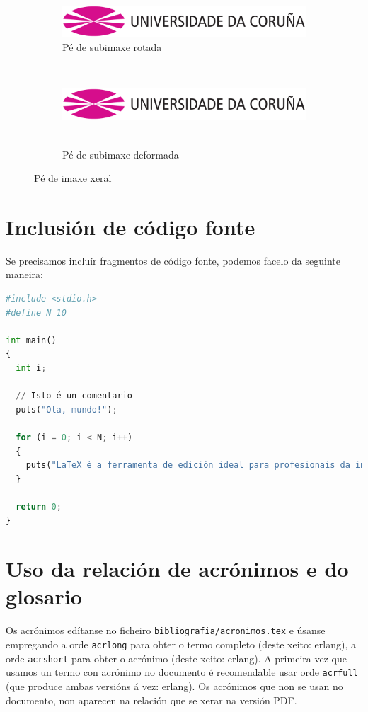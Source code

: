 \begin{figure}[hp!]
  \centering
  \begin{subfigure}[c]{0.3\textwidth}
    \includegraphics[angle=45,width=\textwidth]{imaxes/udc.png}
    \caption{Pé de subimaxe rotada}
    \label{fig:subfigura-rotada}
  \end{subfigure}
  \hspace{0.1\textwidth}
  \begin{subfigure}[c]{0.3\textwidth}
    \includegraphics[width=\textwidth,height=3cm]{imaxes/udc.png}
    \caption{Pé de subimaxe deformada}
    \label{fig:subfigura-deformada}
  \end{subfigure}
  \caption{Pé de imaxe xeral}
  \label{fig:exemplo-subfiguras}
\end{figure}

\section{Inclusión de código fonte}

Se precisamos incluír fragmentos de código fonte, podemos facelo da
seguinte maneira:

\begin{lstlisting}[language=PYTHON]
#include <stdio.h>
#define N 10

int main()
{
  int i;

  // Isto é un comentario
  puts("Ola, mundo!");

  for (i = 0; i < N; i++)
  {
    puts("LaTeX é a ferramenta de edición ideal para profesionais da informática!");
  }

  return 0;
}
\end{lstlisting}

\section{Uso da relación de acrónimos e do glosario}

Os acrónimos edítanse no ficheiro \texttt{bibliografia/acronimos.tex}
e úsanse empregando a orde \texttt{acrlong} para obter o termo
completo (deste xeito: \acrlong{erlang}), a orde \texttt{acrshort}
para obter o acrónimo (deste xeito: \acrshort{erlang}). A primeira vez
que usamos un termo con acrónimo no documento é recomendable usar orde
\texttt{acrfull} (que produce ambas versións á vez:
\acrfull{erlang}). Os acrónimos que non se usan no documento, non
aparecen na relación que se xerar na versión PDF.

